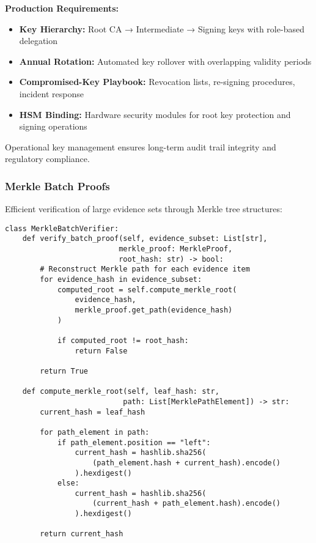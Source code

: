 \documentclass[12pt,a4paper]{article}
\begin{document}
\begin{tcolorbox}[colframe=red!50, colback=red!5, title={\textbf{Key Management (Operational)}}]
\textbf{Production Requirements:}
\begin{itemize}
\item \textbf{Key Hierarchy:} Root CA → Intermediate → Signing keys with role-based delegation
\item \textbf{Annual Rotation:} Automated key rollover with overlapping validity periods
\item \textbf{Compromised-Key Playbook:} Revocation lists, re-signing procedures, incident response
\item \textbf{HSM Binding:} Hardware security modules for root key protection and signing operations
\end{itemize}
Operational key management ensures long-term audit trail integrity and regulatory compliance.
\end{tcolorbox}

\subsubsection{Merkle Batch Proofs}

Efficient verification of large evidence sets through Merkle tree structures:

\begin{lstlisting}[caption=Merkle Batch Verification]
class MerkleBatchVerifier:
    def verify_batch_proof(self, evidence_subset: List[str], 
                          merkle_proof: MerkleProof, 
                          root_hash: str) -> bool:
        # Reconstruct Merkle path for each evidence item
        for evidence_hash in evidence_subset:
            computed_root = self.compute_merkle_root(
                evidence_hash, 
                merkle_proof.get_path(evidence_hash)
            )
            
            if computed_root != root_hash:
                return False
        
        return True
    
    def compute_merkle_root(self, leaf_hash: str, 
                           path: List[MerklePathElement]) -> str:
        current_hash = leaf_hash
        
        for path_element in path:
            if path_element.position == "left":
                current_hash = hashlib.sha256(
                    (path_element.hash + current_hash).encode()
                ).hexdigest()
            else:
                current_hash = hashlib.sha256(
                    (current_hash + path_element.hash).encode()
                ).hexdigest()
        
        return current_hash
\end{lstlisting}
\end{document}
